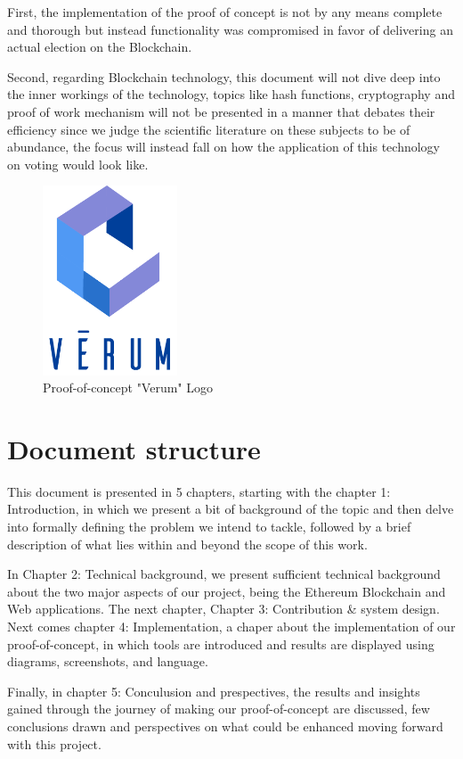 First, the implementation of the proof of concept is not by any means complete and thorough but instead functionality was compromised in favor of delivering an actual election on the Blockchain.

Second, regarding Blockchain technology, this document will not dive deep into the inner workings of the technology, topics like hash functions, cryptography and proof of work mechanism will not be presented in a manner that debates their efficiency since we judge the scientific literature on these subjects to be of abundance, the focus will instead fall on how the application of this technology on voting would look like.

\begin{figure}[h]
	\centering
		\includegraphics[width=4cm]{images/chapter1/verum.png}
		\caption{{\footnotesize Proof-of-concept "Verum" Logo}}
\end{figure}\newpage

\section{Document structure}
This document is presented in 5 chapters, starting with the chapter 1: Introduction, in which we present a bit of background of the topic and then delve into formally defining the problem we intend to tackle, followed by a brief description of what lies within and beyond the scope of this work.

In Chapter 2: Technical background, we present sufficient technical background about the two major aspects of our project, being the Ethereum Blockchain and Web applications. The next chapter, Chapter 3: Contribution \& system design. Next comes chapter 4: Implementation, a chaper about the implementation of our proof-of-concept, in which tools are introduced and results are displayed using diagrams, screenshots, and language.

Finally, in chapter 5: Conculusion and prespectives, the results and insights gained through the journey of making our proof-of-concept are discussed, few conclusions drawn and perspectives on what could be enhanced moving forward with this project.
